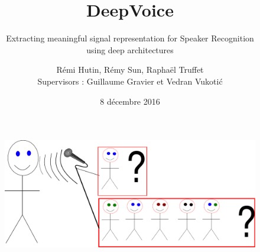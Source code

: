 \documentclass[11pt,english]{beamer}
\title{DeepVoice}
\subtitle{Extracting meaningful signal representation for Speaker Recognition
\\  using deep architectures}
\author[Hutin,Sun,Truffet]{Rémi Hutin, Rémy Sun, Raphaël Truffet \\ Supervisors : Guillaume Gravier et Vedran Vukoti\'c}
\institute{ENS Rennes, IRISA}
\date{8 décembre 2016}
\begin{document}
\begin{frame}
    \titlepage
\end{frame}

\begin{frame}
	\begin{figure}
		\centering
       	\includegraphics[scale = 0.5]{intro.pdf}
	\end{figure}
\end{frame}
\end{document}
